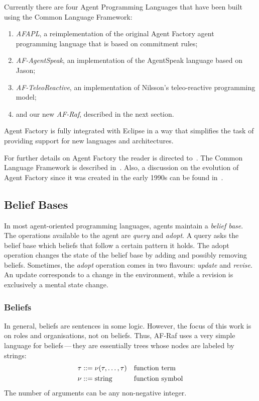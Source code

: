 \documentclass[a4paper,12pt,oneside,fleqn]{book} %
\begin{document}
Currently there are four Agent Programming Languages that have been built
using the Common Language Framework:
\begin{enumerate}

\item \textit{AFAPL}, a reimplementation of the original Agent Factory
agent programming language that is based on commitment rules;

\item \textit{AF-AgentSpeak}, an implementation of the AgentSpeak language based on Jason;

\item \textit{AF-TeleoReactive}, an implementation of Nilsson's teleo-reactive
programming model;

\item and our new \textit{AF-Raf}, described in the next section.
\end{enumerate}

Agent Factory is fully integrated with Eclipse in a way that simplifies
the task of providing support for new languages and architectures.

For further details on Agent Factory the reader is directed
to~\cite{collier2009modeling}. The Common Language Framework is described
in~\cite{russell2011af}. Also, a discussion on the evolution of Agent Factory since it
was created in the early 1990s can be found in~\cite{muldoon2009towards}.


\subsection{Belief Bases} %

In most agent-oriented programming languages, agents maintain a
\emph{belief base}.  The operations available to the agent are
\textit{query} and \textit{adopt}.  A query asks the belief base which
beliefs that follow a certain pattern it holds.  The adopt operation
changes the state of the belief base by adding and possibly removing
beliefs.  Sometimes, the {\it adopt\/} operation comes in two flavours:
{\it update\/} and {\it revise}.  An update corresponds to a change in the
environment, while a revision is exclusively a mental state change.

\subsubsection{Beliefs}

In general, beliefs are sentences in some logic.  However, the focus of
this work is on roles and organisations, not on beliefs.  Thus, AF-Raf uses
a very simple language for beliefs\,---\,they are essentially trees whose
nodes are labeled by strings: \begin{align} \tau &::= \nu(\tau,\ldots,\tau)
&& \text{function term} \\ \nu  &::= {\rm string} &&\text{function symbol}
\end{align} The number of arguments can be any non-negative integer.
\end{document}
